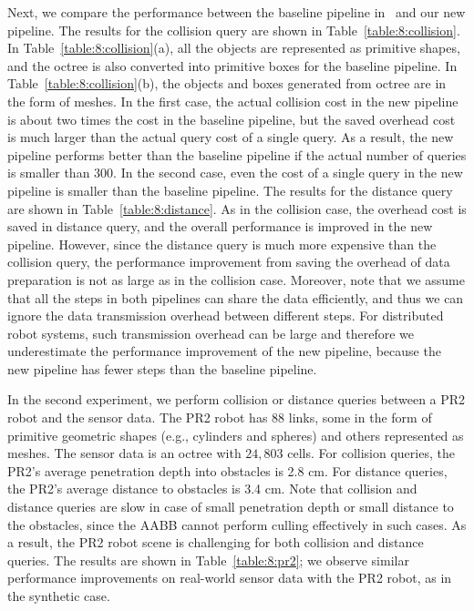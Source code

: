 Next, we compare the performance between the baseline pipeline in~\cite{Rusu:RPG:2009} and our new
pipeline. The results for the collision query are shown in
Table~\ref{table:8:collision}. In
Table~\ref{table:8:collision}(a), all the objects are represented as
primitive shapes, and the octree is also converted into primitive
boxes for the baseline pipeline. In
Table~\ref{table:8:collision}(b), the objects and boxes generated from
octree are in the form of meshes. In the first case, the actual
collision cost in the new pipeline is about two times the cost in the
baseline pipeline, but the saved overhead cost is much larger than the actual query cost of a single
query. As a result, the new pipeline performs better than the baseline
pipeline if the actual number of queries is smaller than $300$. In the
second case, even the cost of a single query in the new pipeline is
smaller than the baseline pipeline. The results for the distance query are
shown in Table~\ref{table:8:distance}. As in the collision case, the
overhead cost is saved in distance query, and the overall performance is improved in the new
pipeline. However, since the distance query is much more expensive than
the collision query, the performance improvement from saving the
overhead of data preparation is not as large as in the collision case. Moreover, note that we assume that all the steps in both pipelines can share the data
efficiently, and thus we can ignore the data transmission overhead
between different \mbox{steps}. For distributed robot systems, such
transmission overhead can be large and therefore we underestimate the
performance improvement of the new pipeline, because the new
pipeline has fewer steps than the baseline pipeline.

In the second experiment, we perform collision or distance queries
between a PR2 robot and the sensor data. The PR2 robot has $88$ links,
some in the form of primitive geometric shapes (e.g., cylinders and spheres) and others represented as meshes. The sensor data is an octree with $24,803$ cells. For collision queries, the PR2's average penetration depth into obstacles is 2.8 cm. For distance queries, the PR2's average distance to obstacles is 3.4 cm. Note that collision and distance queries are slow in case of small penetration depth or small distance to the obstacles, since the AABB cannot perform culling effectively in such cases. As a result, the PR2 robot scene is challenging for both collision and distance queries. The results are shown in Table~\ref{table:8:pr2}; we observe similar performance improvements on real-world sensor data with the PR2 robot, as in the synthetic case.

